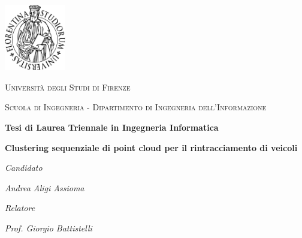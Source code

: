 \documentclass[italian]{report}
\begin{document}
\begin{titlepage}
	\centering
	\includegraphics[width=0.2\textwidth]{logo}\par\vspace{1cm}
	{\scshape\Large Università degli Studi di Firenze \par}
	\vspace{0.5cm}
	{\scshape\large Scuola di Ingegneria - Dipartimento di Ingegneria dell'Informazione \par}
	\vspace{1.5cm}
	{\textbf{Tesi di Laurea Triennale in Ingegneria Informatica} \par}
	\vspace{2cm}

	{\LARGE\bfseries Clustering sequenziale di point cloud per il rintracciamento di veicoli \par}

	\vspace{2cm}
	{\textit{Candidato} \par}
	{\itshape Andrea Aligi Assioma\par}
	\vspace{1cm}
	{\textit{Relatore} \par}
	{\itshape Prof. Giorgio Battistelli\par}
\end{titlepage}

\justifying

\tableofcontents
\newpage
\end{document}
